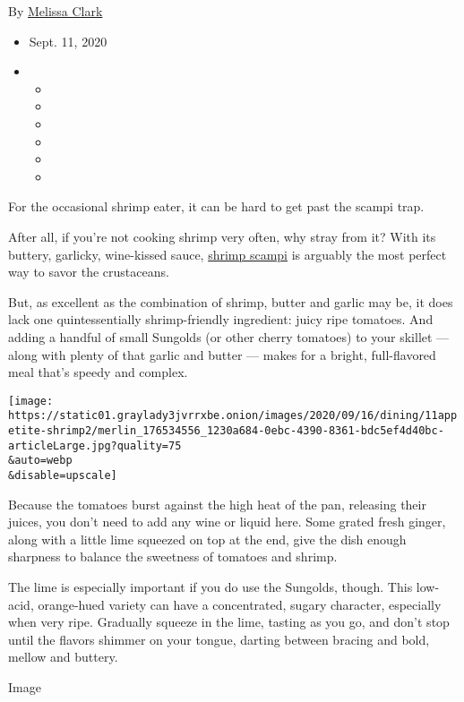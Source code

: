 By \href{https://www.nytimes3xbfgragh.onion/by/melissa-clark}{Melissa
Clark}

\begin{itemize}
\item
  Sept. 11, 2020
\item
  \begin{itemize}
  \item
  \item
  \item
  \item
  \item
  \item
  \end{itemize}
\end{itemize}

For the occasional shrimp eater, it can be hard to get past the scampi
trap.

After all, if you're not cooking shrimp very often, why stray from it?
With its buttery, garlicky, wine-kissed sauce,
\href{https://cooking.nytimes3xbfgragh.onion/recipes/9101-classic-shrimp-scampi}{shrimp
scampi} is arguably the most perfect way to savor the crustaceans.

But, as excellent as the combination of shrimp, butter and garlic may
be, it does lack one quintessentially shrimp-friendly ingredient: juicy
ripe tomatoes. And adding a handful of small Sungolds (or other cherry
tomatoes) to your skillet --- along with plenty of that garlic and
butter --- makes for a bright, full-flavored meal that's speedy and
complex.

\texttt{[image: https://static01.graylady3jvrrxbe.onion/images/2020/09/16/dining/11appetite-shrimp2/merlin\_176534556\_1230a684-0ebc-4390-8361-bdc5ef4d40bc-articleLarge.jpg?quality=75\\\&auto=webp\\\&disable=upscale]}

Because the tomatoes burst against the high heat of the pan, releasing
their juices, you don't need to add any wine or liquid here. Some grated
fresh ginger, along with a little lime squeezed on top at the end, give
the dish enough sharpness to balance the sweetness of tomatoes and
shrimp.

The lime is especially important if you do use the Sungolds, though.
This low-acid, orange-hued variety can have a concentrated, sugary
character, especially when very ripe. Gradually squeeze in the lime,
tasting as you go, and don't stop until the flavors shimmer on your
tongue, darting between bracing and bold, mellow and buttery.

Image

